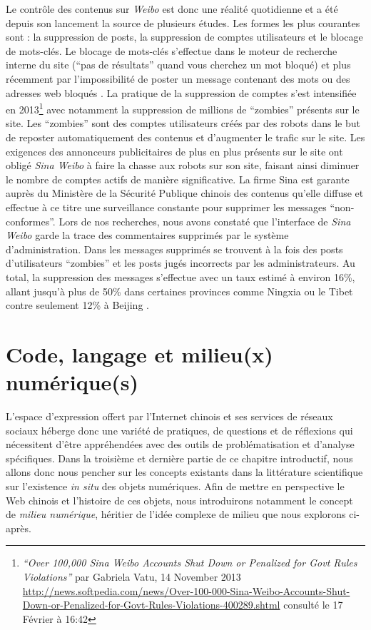 Le contrôle des contenus sur \textit{Weibo} est donc une réalité quotidienne et a été depuis son lancement la source de plusieurs études. Les formes les plus courantes sont : la suppression de posts, la suppression de comptes utilisateurs et le blocage de mots-clés. Le blocage de mots-clés s’effectue dans le moteur de recherche interne du site (“pas de résultats” quand vous cherchez un mot bloqué) et plus récemment par l’impossibilité de poster un message contenant des mots ou des adresses web bloqués \citep{Ng2013}. La pratique de la suppression de comptes s’est intensifiée en 2013\footnote{ \textit{“Over 100,000 \textit{Sina Weibo} Accounts Shut Down or Penalized for Govt Rules Violations”} par Gabriela Vatu, 14 November 2013 \url{http://news.softpedia.com/news/Over-100-000-Sina-Weibo-Accounts-Shut-Down-or-Penalized-for-Govt-Rules-Violations-400289.shtml} consulté le 17 Février à 16:42} avec notamment la suppression de millions de “zombies” présents sur le site. Les “zombies” sont des comptes utilisateurs créés par des robots dans le but de reposter automatiquement des contenus et d'augmenter le trafic sur le site. Les exigences des annonceurs publicitaires de plus en plus présents sur le site ont obligé \textit{Sina Weibo} à faire la chasse aux robots sur son site, faisant ainsi diminuer le nombre de comptes actifs de manière significative. La firme Sina est garante auprès du Ministère de la Sécurité Publique chinois des contenus qu’elle diffuse et effectue à ce titre une surveillance constante pour supprimer les messages “non-conformes”. Lors de nos recherches, nous avons constaté que l’interface de \textit{Sina Weibo} garde la trace des commentaires supprimés par le système d’administration. Dans les messages supprimés se trouvent à la fois des posts d’utilisateurs “zombies” et les posts jugés incorrects par les administrateurs. Au total, la suppression des messages s’effectue avec un taux estimé à environ 16\%, allant jusqu’à plus de 50\% dans certaines provinces comme Ningxia ou le Tibet contre seulement 12\% à Beijing \citep{Bamman2012}.


\section[Code, langage et milieu(x) numérique(s)]{ Code, langage et milieu(x) numérique(s)}

L’espace d’expression offert par l’Internet chinois et ses services de réseaux sociaux héberge donc une variété de pratiques, de questions et de réflexions qui nécessitent d’être appréhendées avec des outils de problématisation et d’analyse spécifiques. Dans la troisième et dernière partie de ce chapitre introductif, nous allons donc nous pencher sur les concepts existants dans la littérature scientifique sur l’existence \textit{in situ} des objets numériques. Afin de mettre en perspective le Web chinois et l’histoire de ces objets, nous introduirons notamment le concept de \textit{milieu numérique}, héritier de l’idée complexe de milieu que nous explorons ci-après.

